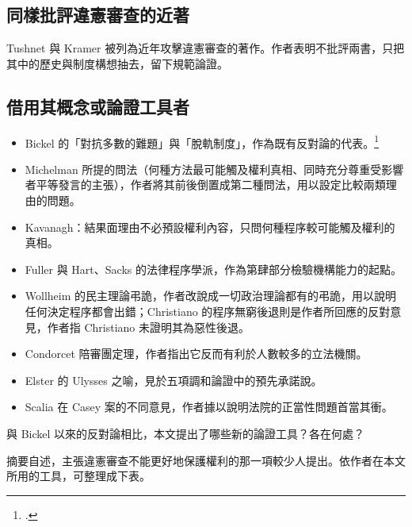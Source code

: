 \subsection{同樣批評違憲審查的近著}

Tushnet 與 Kramer 被列為近年攻擊違憲審查的著作。作者表明不批評兩書，只把其中的歷史與制度構想抽去，留下規範論證。

\subsection{借用其概念或論證工具者}

\begin{itemize}
\item Bickel 的「對抗多數的難題」與「脫軌制度」，作為既有反對論的代表。\footcite[16--18]{bickel1962}
\item Michelman 所提的問法（何種方法最可能觸及權利真相、同時充分尊重受影響者平等發言的主張），作者將其前後倒置成第二種問法，用以設定比較兩類理由的問題。
\item Kavanagh：結果面理由不必預設權利內容，只問何種程序較可能觸及權利的真相。
\item Fuller 與 Hart、Sacks 的法律程序學派，作為第肆部分檢驗機構能力的起點。
\item Wollheim 的民主理論弔詭，作者改說成一切政治理論都有的弔詭，用以說明任何決定程序都會出錯；Christiano 的程序無窮後退則是作者所回應的反對意見，作者指 Christiano 未證明其為惡性後退。
\item Condorcet 陪審團定理，作者指出它反而有利於人數較多的立法機關。
\item Elster 的 Ulysses 之喻，見於五項調和論證中的預先承諾說。
\item Scalia 在 Casey 案的不同意見，作者據以說明法院的正當性問題首當其衝。
\end{itemize}


\begin{qaquestion}
與 Bickel 以來的反對論相比，本文提出了哪些新的論證工具？各在何處？
\end{qaquestion}

摘要自述，主張違憲審查不能更好地保護權利的那一項較少人提出。依作者在本文所用的工具，可整理成下表。

